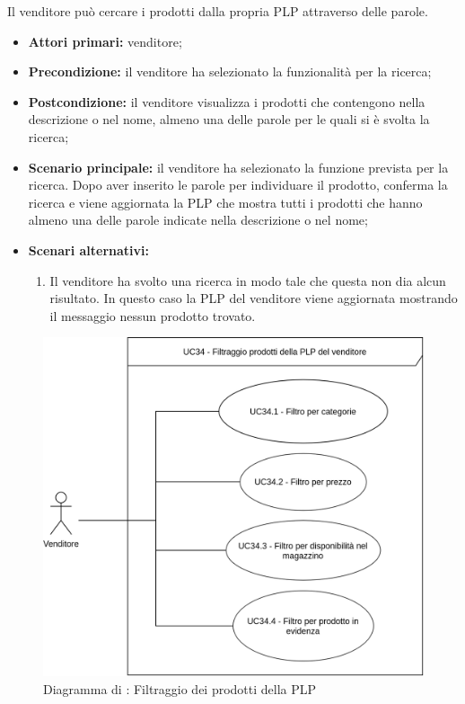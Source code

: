 Il venditore può cercare i prodotti dalla propria PLP attraverso delle parole.
\begin{itemize}
	\item \textbf{Attori primari:} venditore;
	\item \textbf{Precondizione:} il venditore ha selezionato la funzionalità per la ricerca;
	\item \textbf{Postcondizione:} il venditore visualizza i prodotti che contengono nella descrizione o nel nome, almeno una delle parole per le quali si è svolta la ricerca;
	\item \textbf{Scenario principale:} il venditore ha selezionato la funzione prevista per la ricerca. Dopo aver inserito le parole per individuare il prodotto, conferma la ricerca e viene aggiornata la PLP che mostra tutti i prodotti che hanno almeno una delle parole indicate nella descrizione o nel nome;
	\item \textbf{Scenari alternativi:}
	\begin{enumerate}[label=\lett]
		\item Il venditore ha svolto una ricerca in modo tale che questa non dia alcun risultato. In questo caso la PLP del venditore viene aggiornata mostrando il messaggio nessun prodotto trovato.
	\end{enumerate}
\end{itemize}


\label{filtro-prodotti-venditore}

\begin{figure}[H]
	\centering
	\includegraphics[scale=0.8]{Immagini/DiagrammiUC/Venditore/FiltraggioProdottiPLPVenditore.png}
	\caption{Diagramma di \actualUC: Filtraggio dei prodotti della PLP}
	\label{fig:filtro-prodotti-venditore}
\end{figure}


